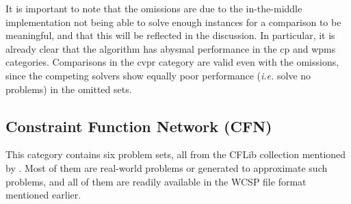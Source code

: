 It is important to note that the omissions are due to the in-the-middle implementation not being able to solve enough instances for a comparison to be meaningful, and that this will be reflected in the discussion.
In particular, it is already clear that the algorithm has abysmal performance in the \gls{cp} and \gls{wpms} categories.
Comparisons in the \gls{cvpr} category are valid even with the omissions, since the competing solvers show equally poor performance (\emph{i.e.} solve no problems) in the omitted sets.

\subsection{Constraint Function Network (CFN)}
This category contains six problem sets, all from the CFLib collection mentioned by \textcite{deGivry14}.
Most of them are real-world problems or generated to approximate such problems, and all of them are readily available in the \textsc{WCSP} file format mentioned earlier.

